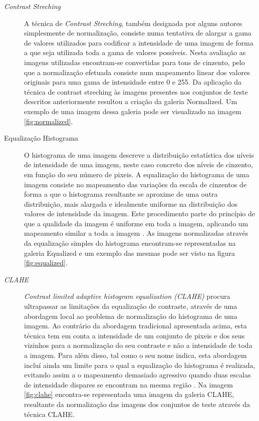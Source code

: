 \begin{description}
\item[\textit{Contrast Streching}]
A técnica de \textit{Contrast Streching}, também designada por alguns autores simplesmente de normalização, consiste numa tentativa de alargar a gama de valores utilizados para codificar a intensidade de uma imagem de forma a que seja utilizada toda a gama de valores possíveis. Nesta avaliação as imagens utilizadas encontram-se convertidas para tons de cinzento, pelo que a normalização efetuada consiste num mapeamento linear dos valores originais para uma gama de intensidade entre 0 e 255. Da aplicação da técnica de contrast streching às imagens presentes nos conjuntos de teste descritos anteriormente resultou a criação da galeria Normalized. Um exemplo de uma imagem dessa galeria pode ser visualizado na imagem \ref{fig:normalized}.
\end{description}

\begin{description}
\item[Equalização Histograma]
O histograma de uma imagem descreve a distribuição estatística dos níveis de intensidade de uma imagem, neste caso concreto dos níveis de cinzento, em função do seu número de pixeis. A equalização do histograma de uma imagem consiste no mapeamento das variações da escala de cinzentos de forma a que o histograma resultante se aproxime de uma outra distribuição, mais alargada e idealmente uniforme na distribuição dos valores de intensidade da imagem. Este procedimento parte do princípio de que a qualidade da imagem é uniforme em toda a imagem, aplicando um mapeamento similar a toda a imagem \cite{Bradski2008}. As imagens normalizadas através da equalização simples do histograma encontram-se representadas na galeria Equalized e um exemplo das mesmas pode ser visto na figura \ref{fig:equalized}.
\end{description}

\begin{description}
\item[\textit{CLAHE}]
\textit{Contrast limited adaptive histogram equalization (CLAHE)} procura ultrapassar as limitações da equalização de contraste, através de uma abordagem local ao problema de normalização do histograma de uma imagem. Ao contrário da abordagem tradicional apresentada acima, esta técnica tem em conta a intensidade de um conjunto de pixeis e dos seus vizinhos para a normalização do seu contraste e não a intensidade de toda a imagem. Para além disso, tal como o seu nome indica, esta abordagem incluí ainda um limite para o qual a equalização do histograma é realizada, evitando assim a o mapeamento demasiado agressivo quando duas escalas de intensidade dispares se encontram na mesma região \cite{Reza2004}. Na imagem \ref{fig:clahe} encontra-se representada uma imagem da galeria CLAHE, resultante da normalização das imagens dos conjuntos de teste através da técnica CLAHE.
\end{description}

